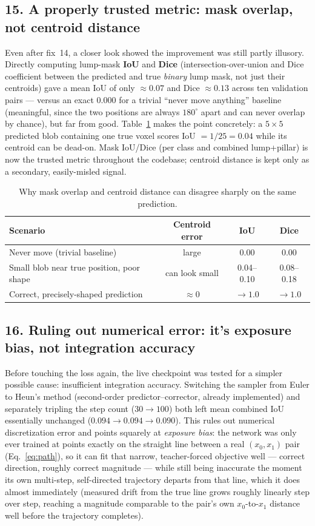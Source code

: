 \documentclass[11pt]{article}
\newcommand{\hsub}[1]{\subsection*{#1}}
\begin{document}
\hsub{15. A properly trusted metric: mask overlap, not centroid distance}
Even after fix~14, a closer look showed the improvement was still partly illusory. Directly
computing lump-mask \textbf{IoU} and \textbf{Dice} (intersection-over-union and Dice
coefficient between the predicted and true \emph{binary} lump mask, not just their centroids)
gave a mean IoU of only $\approx 0.07$ and Dice $\approx 0.13$ across ten validation pairs ---
versus an exact $0.000$ for a trivial ``never move anything'' baseline (meaningful, since the
two positions are always $180^\circ$ apart and can never overlap by chance), but far from
good. Table~\ref{tab:iou-example} makes the point concretely: a $5\times5$ predicted blob
containing one true voxel scores IoU $= 1/25 = 0.04$ while its centroid can be dead-on. Mask
IoU/Dice (per class and combined lump+pillar) is now the trusted metric throughout the
codebase; centroid distance is kept only as a secondary, easily-misled signal.
\begin{table}[h]
\centering
\begin{tabular}{@{}lccc@{}}
\toprule
Scenario & Centroid error & IoU & Dice \\
\midrule
Never move (trivial baseline) & large & 0.00 & 0.00 \\
Small blob near true position, poor shape & can look small & 0.04--0.10 & 0.08--0.18 \\
Correct, precisely-shaped prediction & $\approx 0$ & $\to 1.0$ & $\to 1.0$ \\
\bottomrule
\end{tabular}
\caption{Why mask overlap and centroid distance can disagree sharply on the same prediction.}
\label{tab:iou-example}
\end{table}

\hsub{16. Ruling out numerical error: it's exposure bias, not integration accuracy}
Before touching the loss again, the live checkpoint was tested for a simpler possible cause:
insufficient integration accuracy. Switching the sampler from Euler to Heun's method
(second-order predictor--corrector, already implemented) and separately tripling the step
count ($30\!\to\!100$) both left mean combined IoU essentially unchanged
($0.094 \to 0.094 \to 0.090$). This rules out numerical discretization error and points
squarely at \emph{exposure bias}: the network was only ever trained at points exactly on the
straight line between a real $(x_0,x_1)$ pair (Eq.~\eqref{eq:path}), so it can fit that
narrow, teacher-forced objective well --- correct direction, roughly correct magnitude ---
while still being inaccurate the moment its own multi-step, self-directed trajectory departs
from that line, which it does almost immediately (measured drift from the true line grows
roughly linearly step over step, reaching a magnitude comparable to the pair's own
$x_0$-to-$x_1$ distance well before the trajectory completes).
\end{document}
